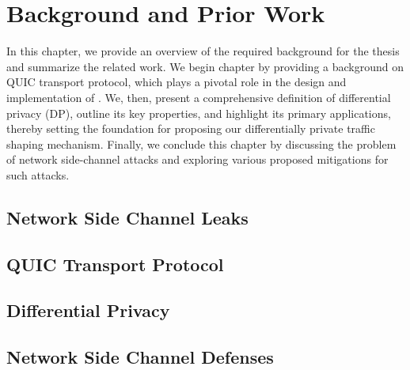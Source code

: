 \chapter{Background and Prior Work}\label{ch:background}




In this chapter, we provide an overview of the required background for the thesis and summarize the related work.
We begin chapter by providing a background on QUIC transport protocol, which plays a pivotal role in the design and implementation of {\sys}.
We, then, present a comprehensive definition of differential privacy (DP), outline its key properties, and highlight its primary applications, thereby setting the foundation for proposing our differentially private traffic shaping mechanism.
Finally, we conclude this chapter by discussing the problem of network side-channel attacks and exploring various proposed mitigations for such attacks. 

\section{Network Side Channel Leaks}\label{sec:ns-attacks}



\section{QUIC Transport Protocol}


\section{Differential Privacy}\label{sec:dp-background}



\section{Network Side Channel Defenses}\label{sec:ns-defenses}







